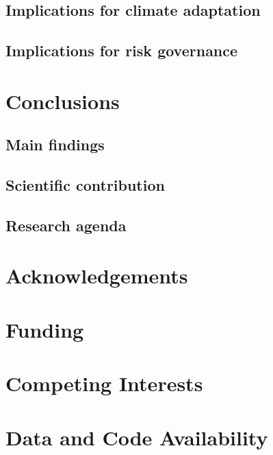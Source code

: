 \documentclass[11pt,a4paper]{article}
\begin{document}
\subsection{Implications for climate adaptation}

\subsection{Implications for risk governance}


\section{Conclusions}

\subsection{Main findings}

\subsection{Scientific contribution}

\subsection{Research agenda}


\section*{Acknowledgements}



\section*{Funding}



\section*{Competing Interests}



\section*{Data and Code Availability}
\end{document}
